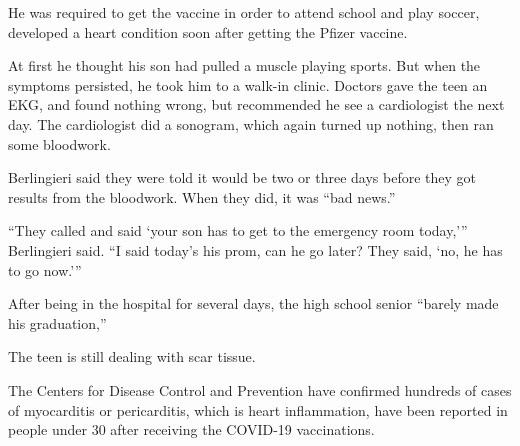 He was required to get the vaccine in order to attend school and play soccer,
developed a heart condition soon after getting the Pfizer vaccine.

At first he thought his son had pulled a muscle playing sports. But when the
symptoms persisted, he took him to a walk-in clinic. Doctors gave the teen an
EKG, and found nothing wrong, but recommended he see a cardiologist the next
day. The cardiologist did a sonogram, which again turned up nothing, then ran
some bloodwork.

Berlingieri said they were told it would be two or three days before they got
results from the bloodwork. When they did, it was “bad news.”

“They called and said ‘your son has to get to the emergency room today,’”
Berlingieri said. “I said today’s his prom, can he go later? They said, ‘no, he
has to go now.’”

After being in the hospital for several days, the high school senior “barely
made his graduation,”

The teen is still dealing with scar tissue.

The Centers for Disease Control and Prevention have confirmed hundreds of cases
of myocarditis or pericarditis, which is heart inflammation, have been reported
in people under 30 after receiving the COVID-19 vaccinations.


